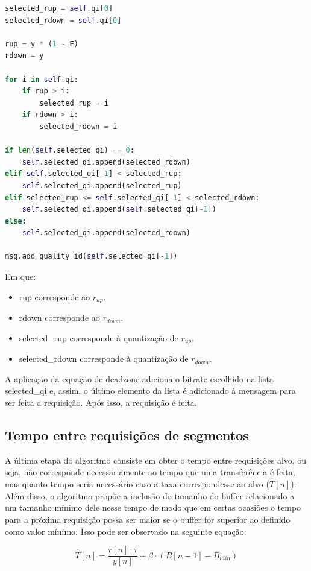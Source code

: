 \documentclass[10pt,twocolumn,letterpaper]{article}
\begin{document}
	\begin{lstlisting}[language=python]
selected_rup = self.qi[0]
selected_rdown = self.qi[0]

rup = y * (1 - E)
rdown = y

for i in self.qi:
	if rup > i:
		selected_rup = i
	if rdown > i:
		selected_rdown = i

if len(self.selected_qi) == 0:
	self.selected_qi.append(selected_rdown)
elif self.selected_qi[-1] < selected_rup:
	self.selected_qi.append(selected_rup)
elif selected_rup <= self.selected_qi[-1] < selected_rdown:
	self.selected_qi.append(self.selected_qi[-1])
else:
	self.selected_qi.append(selected_rdown)

msg.add_quality_id(self.selected_qi[-1])
	\end{lstlisting}
	
	Em que:
	\begin{itemize}
		\item rup corresponde ao $r_{up}$.
		\item rdown corresponde ao $r_{down}$.
		\item selected\_rup corresponde à quantização de $r_{up}$.
		\item selected\_rdown corresponde à quantização de $r_{down}$.
	\end{itemize}
	
	A aplicação da equação de deadzone adiciona o bitrate escolhido na lista selected\_qi e, assim, o último elemento da lista é adicionado à mensagem para ser feita a requisição. Após isso, a requisição é feita.
	
	\subsection{Tempo entre requisições de segmentos}
	A última etapa do algoritmo consiste em obter o tempo entre requisições alvo, ou seja, não corresponde necessariamente ao tempo que uma transferência é feita, mas quanto tempo seria necessário caso a taxa correspondesse ao alvo ($\hat{T}[n]$). Além disso, o algoritmo propõe a inclusão do tamanho do buffer relacionado a um tamanho mínimo dele nesse tempo de modo que em certas ocasiões o tempo para a próxima requisição possa ser maior se o buffer for superior ao definido como valor mínimo. Isso pode ser observado na seguinte equação:
	
	\begin{equation}
		\hat{T}[n] = \frac{r[n] \cdot \tau}{y[n]} + \beta \cdot (B[n-1] - B_{min})
	\end{equation}
	
\end{document}
